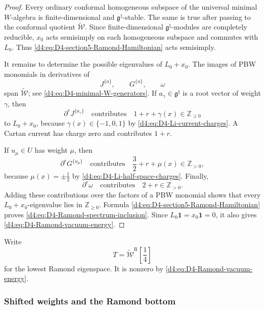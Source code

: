 \documentclass[11pt,reqno]{amsart}
\theoremstyle{definition}
\theoremstyle{remark}
\begin{document}
\begin{proof}
Every ordinary conformal homogeneous subspace of the universal minimal
\(W\)-algebra is finite-dimensional and
\(\mathfrak g^\natural\)-stable.  The same is true after passing to the
conformal quotient \(\widetilde{\mathcal W}\).  Since finite-dimensional
\(\mathfrak g^\natural\)-modules are completely reducible, \(x_0\) acts
semisimply on each homogeneous subspace and commutes with \(L_0\).
Thus \eqref{d4:eq:D4-section5-Ramond-Hamiltonian} acts semisimply.

It remains to determine the possible eigenvalues of \(L_0+x_0\).
The images of PBW monomials in derivatives of
\[
  J^{\{a\}},
  \qquad
  G^{\{u\}},
  \qquad
  \omega
\]
span \(\widetilde{\mathcal W}\); see
\eqref{d4:eq:D4-minimal-W-generators}.  If
\(a_\gamma\in\mathfrak g^\natural\) is a root vector of weight
\(\gamma\), then
\begin{equation*}
  \partial^rJ^{\{a_\gamma\}}
  \quad\text{contributes}\quad
  1+r+\gamma(x)
  \in\mathbb Z_{\ge0}
\end{equation*}
to \(L_0+x_0\), because
\(\gamma(x)\in\{-1,0,1\}\) by
\eqref{d4:eq:D4-Li-current-charges}.  A Cartan current has charge zero and
contributes \(1+r\).

If \(u_\mu\in U\) has weight \(\mu\), then
\begin{equation*}
  \partial^rG^{\{u_\mu\}}
  \quad\text{contributes}\quad
  \frac32+r+\mu(x)
  \in\mathbb Z_{>0},
\end{equation*}
because \(\mu(x)=\pm\frac12\) by
\eqref{d4:eq:D4-Li-half-space-charges}.  Finally,
\begin{equation*}
  \partial^r\omega
  \quad\text{contributes}\quad
  2+r\in\mathbb Z_{>0}.
\end{equation*}
Adding these contributions over the factors of a PBW monomial shows that
every \(L_0+x_0\)-eigenvalue lies in \(\mathbb Z_{\ge0}\).  Formula
\eqref{d4:eq:D4-section5-Ramond-Hamiltonian} proves
\eqref{d4:eq:D4-Ramond-spectrum-inclusion}.  Since
\(L_0\mathbf1=x_0\mathbf1=0\), it also gives
\eqref{d4:eq:D4-Ramond-vacuum-energy}.
\end{proof}

Write
\begin{equation*}
  T=\widetilde{\mathcal W}^{\mathrm R}
    \!\left[\frac14\right]
\end{equation*}
for the lowest Ramond eigenspace.  It is nonzero by
\eqref{d4:eq:D4-Ramond-vacuum-energy}.

\subsubsection{Shifted weights and the Ramond bottom}
\end{document}
